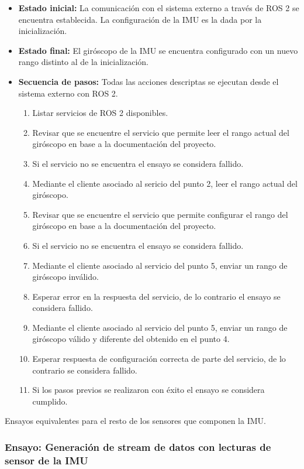 \documentclass[
11pt, %
codirector, %
]{simple_charter}
\begin{document}
\begin{itemize}
	\item \textbf{Estado inicial:} La comunicación con el sistema externo a través de ROS 2 se
	encuentra establecida. La configuración de la IMU es la dada por la inicialización.
	\item \textbf{Estado final:} El giróscopo de la IMU se encuentra configurado con un nuevo rango
	distinto al de la inicialización.
	\item \textbf{Secuencia de pasos:} Todas las acciones descriptas se ejecutan desde el sistema
	externo con ROS 2.
	\begin{enumerate}
		\item Listar servicios de ROS 2 disponibles.
		\item Revisar que se encuentre el servicio que permite leer el rango actual del giróscopo
		en base a la documentación del proyecto.
		\item Si el servicio no se encuentra el ensayo se considera fallido.
		\item Mediante el cliente asociado al sericio del punto 2, leer el rango actual del
		giróscopo.
		\item Revisar que se encuentre el servicio que permite configurar el rango del giróscopo
		en base a la documentación del proyecto.
		\item Si el servicio no se encuentra el ensayo se considera fallido.
		\item Mediante el cliente asociado al servicio del punto 5, enviar un rango de giróscopo
		inválido.
		\item Esperar error en la respuesta del servicio, de lo contrario el ensayo se considera
		fallido.
		\item Mediante el cliente asociado al servicio del punto 5, enviar un rango de giróscopo
		válido y diferente del obtenido en el punto 4.
		\item Esperar respuesta de configuración correcta de parte del servicio, de lo contrario se
		considera fallido.
		\item Si los pasos previos se realizaron con éxito el ensayo se considera cumplido.
	\end{enumerate}
\end{itemize}

Ensayos equivalentes para el resto de los sensores que componen la IMU.

\subsubsection{Ensayo: Generación de stream de datos con lecturas de sensor de la IMU}
\label{sssec:ensayo-generacion-de-stream-de-datos-con-lecturas-de-sensor-de-la-imu}
\end{document}
